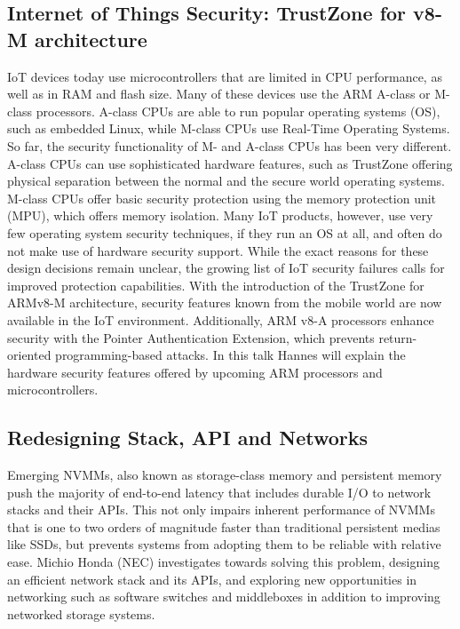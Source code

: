 \subsection{Internet of Things Security: TrustZone for v8-M architecture}

\ac{IoT} devices today use microcontrollers that are limited in CPU
performance, as well as in RAM and flash size. Many of these devices use the
ARM A-class or M-class processors. A-class CPUs are able to run popular
operating systems (OS), such as embedded Linux, while M-class CPUs use
Real-Time Operating Systems. So far, the security functionality of M- and
A-class CPUs has been very different.  A-class CPUs can use sophisticated
hardware features, such as TrustZone offering physical separation between the
normal and the secure world operating systems. M-class CPUs offer basic
security protection using the memory protection unit (MPU), which offers
memory isolation.  Many IoT products, however, use very few operating system
security techniques, if they run an OS at all, and often do not make use of
hardware security support. While the exact reasons for these design decisions
remain unclear, the growing list of IoT security failures calls for improved
protection capabilities.  With the introduction of the TrustZone for ARMv8-M
architecture, security features known from the mobile world are now available
in the \ac{IoT} environment. Additionally, ARM v8-A processors  enhance
security with the Pointer Authentication Extension, which prevents
return-oriented programming-based attacks.  In this talk Hannes will explain
the hardware security features offered by upcoming ARM processors and
microcontrollers.

\subsection{Redesigning Stack, API and Networks}

Emerging \ac{NVMMs}, also known as storage-class memory and persistent memory
push the majority of end-to-end latency that includes durable I/O to network
stacks and their APIs.  This not only impairs inherent performance of
\ac{NVMMs} that is one to two orders of magnitude faster than traditional
persistent medias like \ac{SSDs}, but prevents systems from adopting them to
be reliable with relative ease. Michio Honda (NEC) investigates towards
solving this problem, designing an efficient network stack and its APIs, and
exploring new opportunities in networking such as software switches and
middleboxes in addition to improving networked storage systems.

